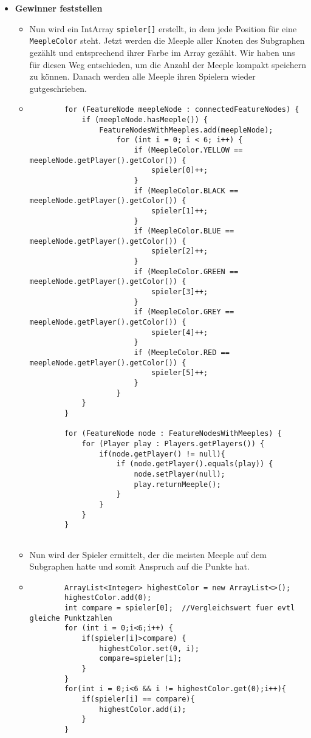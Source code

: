 \begin{itemize}
\clearpage	
	
\item \textbf{Gewinner feststellen}
	\begin{itemize}
	
	\item[]
		Nun wird ein IntArray \texttt{spieler[]} erstellt, in dem jede Position für eine \texttt{MeepleColor} steht.
		Jetzt werden die Meeple aller Knoten des Subgraphen gezählt und entsprechend ihrer Farbe im Array gezählt. Wir haben uns für diesen Weg entschieden, um die Anzahl der Meeple kompakt speichern zu können. Danach werden alle Meeple 		
		ihren Spielern wieder gutgeschrieben.
	
	\item[]
		\begin{lstlisting}
		for (FeatureNode meepleNode : connectedFeatureNodes) {
			if (meepleNode.hasMeeple()) {
				FeatureNodesWithMeeples.add(meepleNode);
					for (int i = 0; i < 6; i++) {
						if (MeepleColor.YELLOW == meepleNode.getPlayer().getColor()) {
							spieler[0]++;
						}
						if (MeepleColor.BLACK == meepleNode.getPlayer().getColor()) {
							spieler[1]++;
						}
						if (MeepleColor.BLUE == meepleNode.getPlayer().getColor()) {
							spieler[2]++;
						}
						if (MeepleColor.GREEN == meepleNode.getPlayer().getColor()) {
							spieler[3]++;
						}				
						if (MeepleColor.GREY == meepleNode.getPlayer().getColor()) {
							spieler[4]++;
						}				
						if (MeepleColor.RED == meepleNode.getPlayer().getColor()) {
							spieler[5]++;
						}
					}
			}
		}
					
		for (FeatureNode node : FeatureNodesWithMeeples) {
			for (Player play : Players.getPlayers()) {
				if(node.getPlayer() != null){
					if (node.getPlayer().equals(play)) {
						node.setPlayer(null);
						play.returnMeeple();
				  	}
				}
			}
		}
		
		\end{lstlisting}
		
	\item[]
		Nun wird der Spieler ermittelt, der die meisten Meeple auf dem Subgraphen hatte und somit Anspruch auf die Punkte hat.
		
	\item[]
		\begin{lstlisting}
		ArrayList<Integer> highestColor = new ArrayList<>();
		highestColor.add(0);						
		int compare = spieler[0];  //Vergleichswert fuer evtl gleiche Punktzahlen
		for (int i = 0;i<6;i++) {
			if(spieler[i]>compare) {
				highestColor.set(0, i);
				compare=spieler[i];
			}
		}
		for(int i = 0;i<6 && i != highestColor.get(0);i++){
			if(spieler[i] == compare){
				highestColor.add(i);
			}
		}
		\end{lstlisting}	
		

\end{itemize}
\end{itemize}
